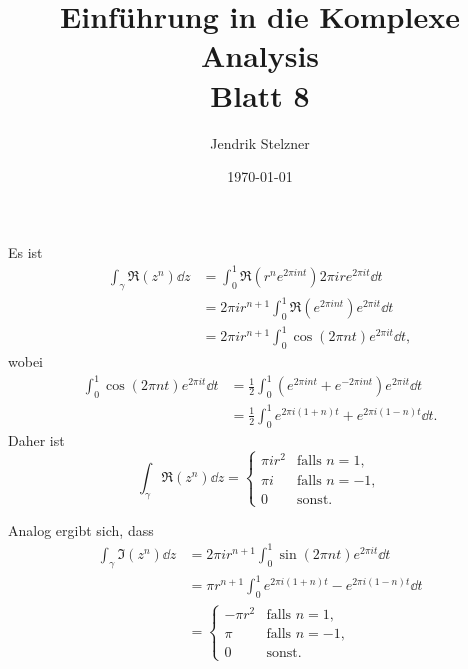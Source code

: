 \documentclass[a4paper,10pt]{article}
\title{Einführung in die Komplexe Analysis \\ \Large Blatt 8}
\author{Jendrik Stelzner}
\date{\today}
\begin{document}
\maketitle





\section{}


\subsection{}
Es ist
\begin{align*}
 \int_\gamma \Re\left( z^n \right) \dd{z}
 &= \int_0^1 \Re\left( r^n e^{2\pi i n t} \right) 2\pi i r e^{2\pi i t} \dd{t} \\
 &= 2\pi i r^{n+1} \int_0^1 \Re\left( e^{2\pi i n t} \right) e^{2\pi i t} \dd{t} \\
 &= 2\pi i r^{n+1} \int_0^1 \cos( 2\pi n t ) e^{2\pi i t} \dd{t},
\end{align*}
wobei
\begin{align*}
 \int_0^1 \cos( 2\pi n t ) e^{2\pi i t} \dd{t}
 &= \frac{1}{2} \int_0^1 \left( e^{2\pi i n t} + e^{-2\pi i n t} \right) e^{2\pi i t} \dd{t} \\
 &= \frac{1}{2} \int_0^1 e^{2\pi i (1+n) t} + e^{2\pi i (1-n) t} \dd{t}.
\end{align*}
Daher ist
\[
 \int_\gamma \Re\left( z^n \right) \dd{z}
 = \begin{cases} \pi i r^2 & \text{falls } n = 1, \\ \pi i & \text{falls } n = -1, \\ 0 & \text{sonst}. \end{cases}
\]

Analog ergibt sich, dass
\begin{align*}
\int_\gamma \Im\left( z^n \right) \dd{z}
 &= 2\pi i r^{n+1} \int_0^1 \sin( 2\pi n t ) e^{2\pi i t} \dd{t} \\
 &= \pi r^{n+1} \int_0^1 e^{2\pi i (1+n) t} - e^{2\pi i (1-n) t} \dd{t} \\
 &=
 \begin{cases}
  -\pi r^2 & \text{falls } n=1, \\
   \pi     & \text{falls } n = -1, \\
         0 & \text{sonst}.
 \end{cases}
\end{align*}
\end{document}
